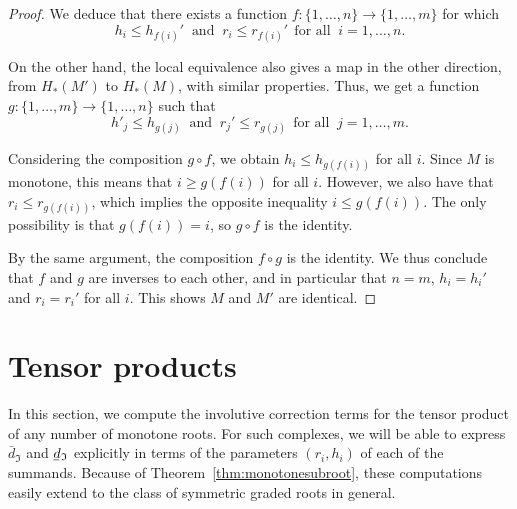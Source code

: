\documentclass[11 pt]{amsart}
\theoremstyle{remark}
\newcommand{\bunderline}[1]{\underline{#1\mkern-2mu}\mkern2mu }
\def\du {\bar{d}}
\def\dl {\bunderline{d}}
\def\Inv{\mathfrak{I}}
\begin{document}
\begin{proof}
We deduce that there exists a function $f: \{1, \dots, n\} \to\{1, \dots, m\}$ for which
$$ h_i \leq h_{f(i)}' \ \text{ and } \ r_i \leq r_{f(i)}' \ \ \text{for all } \ i=1, \dots, n.$$

On the other hand, the local equivalence also gives a map in the other direction, from $H_*(M')$ to $H_*(M)$, with similar properties. Thus, we get a function $g: \{1, \dots, m\} \to\{1, \dots, n\}$ such that
$$ h'_j \leq h_{g(j)} \ \text{ and } \ r_j' \leq r_{g(j)} \ \ \text{for all } \ j=1, \dots, m.$$

Considering the composition $g \circ f$, we obtain $h_i \leq h_{g(f(i))}$ for all $i$. Since $M$ is monotone, this means that $i \geq g(f(i))$ for all $i$. However, we also have that  $r_i \leq r_{g(f(i))}$, which implies the opposite inequality $i \leq g(f(i))$. The only possibility is that $g(f(i))=i$, so $g \circ f$ is the identity. 

By the same argument, the composition $f \circ g$ is the identity. We thus conclude that $f$ and $g$ are inverses to each other, and in particular that $n=m$, $h_i = h_i'$ and $r_i = r_i'$ for all $i$. This shows $M$ and $M'$ are identical.
\end{proof}








\section{Tensor products}
\label{sec:tensor}
In this section, we compute the involutive correction terms for the tensor product of any number of monotone roots. For such complexes, we will be able to express $\du_{\Inv}$ and $\dl_{\Inv}$ explicitly in terms of the parameters $(r_i, h_i)$ of each of the summands. Because of Theorem~\ref{thm:monotonesubroot}, these computations easily extend to the class of symmetric graded roots in general. 
\end{document}
